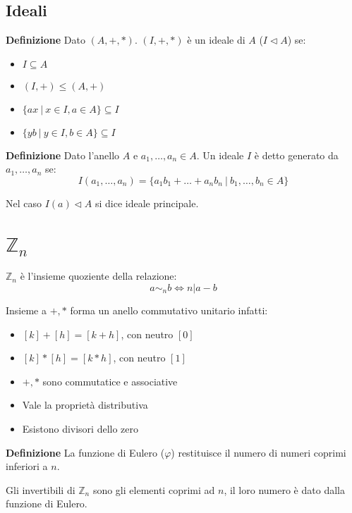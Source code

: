 \documentclass{article}
\begin{document}
\subsection{Ideali}

\noindent\textbf{Definizione} Dato $(A,+,*)$. $(I,+,*)$ è un ideale di $A$ ($I\triangleleft A$) se:
\begin{itemize}
    \item $I\subseteq A$
    \item $(I,+)\leqslant(A,+)$
    \item $\{ax\ |\ x\in I,a\in A\}\subseteq I$
    \item $\{yb\ |\ y\in I,b\in A\}\subseteq I$\newline
\end{itemize}

\noindent\textbf{Definizione} Dato l'anello $A$ e $a_1,\ldots,a_n\in A$. Un ideale $I$ è detto generato da $a_1,\ldots,a_n$ se:
$$I(a_1,\ldots,a_n)=\{a_1b_1+\ldots+a_nb_n\ |\ b_1,\ldots,b_n\in A\}$$

\noindent Nel caso $I(a)\triangleleft A$ si dice ideale principale.\newline

\section{$\mathbb{Z}_n$}

$\mathbb{Z}_n$ è l'insieme quoziente della relazione:
$$a\sim_nb\iff n|a-b$$\newline

\noindent Insieme a $+,*$ forma un anello commutativo unitario infatti:
\begin{itemize}
    \item $[k]+[h]=[k+h]$, con neutro $[0]$
    \item $[k]*[h]=[k*h]$, con neutro $[1]$
    \item $+,*$ sono commutatice e associative
    \item Vale la proprietà distributiva
    \item Esistono divisori dello zero\newline
\end{itemize}

\noindent\textbf{Definizione} La funzione di Eulero ($\varphi$) restituisce il numero di numeri coprimi inferiori a $n$.\newline

\noindent Gli invertibili di $\mathbb{Z}_n$ sono gli elementi coprimi ad $n$, il loro numero è dato dalla funzione di Eulero.\newline 
\end{document}
